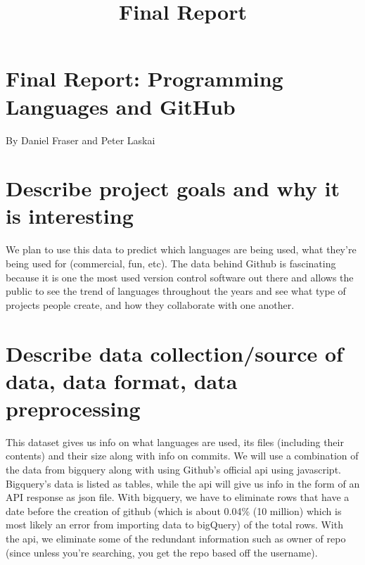 \documentclass[11pt]{article}
\title{Final Report}
\begin{document}
    
    
    \maketitle
    
    

    
    \hypertarget{final-report-programming-languages-and-github}{%
\section{Final Report: Programming Languages and
GitHub}\label{final-report-programming-languages-and-github}}

By Daniel Fraser and Peter Laskai

    \hypertarget{describe-project-goals-and-why-it-is-interesting}{%
\section{Describe project goals and why it is
interesting}\label{describe-project-goals-and-why-it-is-interesting}}

We plan to use this data to predict which languages are being used, what
they're being used for (commercial, fun, etc). The data behind Github is
fascinating because it is one the most used version control software out
there and allows the public to see the trend of languages throughout the
years and see what type of projects people create, and how they
collaborate with one another.

    \hypertarget{describe-data-collectionsource-of-data-data-format-data-preprocessing}{%
\section{Describe data collection/source of data, data format, data
preprocessing}\label{describe-data-collectionsource-of-data-data-format-data-preprocessing}}

This dataset gives us info on what languages are used, its files
(including their contents) and their size along with info on commits. We
will use a combination of the data from bigquery along with using
Github's official api using javascript. Bigquery's data is listed as
tables, while the api will give us info in the form of an API response
as json file. With bigquery, we have to eliminate rows that have a date
before the creation of github (which is about 0.04\% (10 million) which
is most likely an error from importing data to bigQuery) of the total
rows. With the api, we eliminate some of the redundant information such
as owner of repo (since unless you're searching, you get the repo based
off the username).
\end{document}
